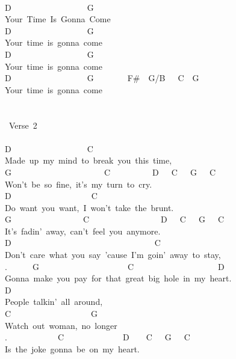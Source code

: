 {\\
D\ \ \ \ \ \ \ \ \ \ \ \ \ \ \ \ \ \ G\ \\
Your\ Time\ Is\ Gonna\ Come\ \\
D\ \ \ \ \ \ \ \ \ \ \ \ \ \ \ \ \ \ G\\
Your\ time\ is\ gonna\ come\\
D\ \ \ \ \ \ \ \ \ \ \ \ \ \ \ \ \ \ G\\
Your\ time\ is\ gonna\ come\\
D\ \ \ \ \ \ \ \ \ \ \ \ \ \ \ \ \ \ G\ \ \ \ \ \ \ \ F\#\ \ G/B\ \ \ C\ \ G\\
Your\ time\ is\ gonna\ come\\
\\
\\
\lbrack\ Verse\ 2\rbrack\\
\\
D\ \ \ \ \ \ \ \ \ \ \ \ \ \ \ \ \ \ C\ \\
Made\ up\ my\ mind\ to\ break\ you\ this\ time,\\
G\ \ \ \ \ \ \ \ \ \ \ \ \ \ \ \ \ \ \ \ \ \ C\ \ \ \ \ \ \ \ \ \ D\ \ \ C\ \ \ G\ \ \ C\\
Won't\ be\ so\ fine,\ it's\ my\ turn\ to\ cry.\\
D\ \ \ \ \ \ \ \ \ \ \ \ \ \ \ \ \ \ \ C\ \\
Do\ want\ you\ want,\ I\ won't\ take\ the\ brunt.\\
G\ \ \ \ \ \ \ \ \ \ \ \ \ \ \ \ \ C\ \ \ \ \ \ \ \ \ \ \ \ \ \ \ \ \ D\ \ \ C\ \ \ G\ \ \ C\\
It's\ fadin'\ away,\ can't\ feel\ you\ anymore.\\
D\ \ \ \ \ \ \ \ \ \ \ \ \ \ \ \ \ \ \ \ \ \ \ \ \ \ \ \ \ \ \ \ \ \ C\\
Don't\ care\ what\ you\ say\ 'cause\ I'm\ goin'\ away\ to\ stay,\\
.\ \ \ \ \ \ G\ \ \ \ \ \ \ \ \ \ \ \ \ \ \ \ \ \ \ \ \ C\ \ \ \ \ \ \ \ \ \ \ \ \ \ \ \ \ \ \ \ D\\
Gonna\ make\ you\ pay\ for\ that\ great\ big\ hole\ in\ my\ heart.\\
D\\
People\ talkin'\ all\ around,\\
C\ \ \ \ \ \ \ \ \ \ \ \ \ \ \ \ \ \ \ G\\
Watch\ out\ woman,\ no\ longer\\
.\ \ \ \ \ \ \ \ \ \ \ \ C\ \ \ \ \ \ \ \ \ \ \ \ \ \ D\ \ \ \ C\ \ \ G\ \ \ C\\
Is\ the\ joke\ gonna\ be\ on\ my\ heart.\\
}
